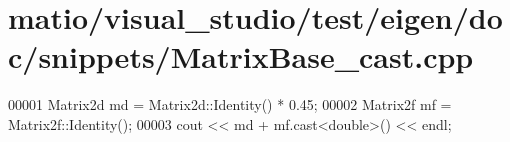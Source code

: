 \hypertarget{matio_2visual__studio_2test_2eigen_2doc_2snippets_2_matrix_base__cast_8cpp_source}{}\section{matio/visual\+\_\+studio/test/eigen/doc/snippets/\+Matrix\+Base\+\_\+cast.cpp}
\label{matio_2visual__studio_2test_2eigen_2doc_2snippets_2_matrix_base__cast_8cpp_source}

\begin{DoxyCode}
00001 Matrix2d md = Matrix2d::Identity() * 0.45;
00002 Matrix2f mf = Matrix2f::Identity();
00003 cout << md + mf.cast<\textcolor{keywordtype}{double}>() << endl;
\end{DoxyCode}
